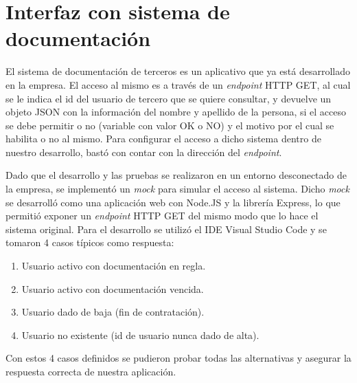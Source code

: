 \section{Interfaz con sistema de documentación}

El sistema de documentación de terceros es un aplicativo que ya está desarrollado en la empresa. El acceso al mismo es a través de un \textit{endpoint} HTTP GET, al cual se le indica el id del usuario de tercero que se quiere consultar, y devuelve un objeto JSON con la información del nombre y apellido de la persona, si el acceso se debe permitir o no (variable con valor OK o NO) y el motivo por el cual se habilita o no al mismo. Para configurar el acceso a dicho sistema dentro de nuestro desarrollo, bastó con contar con la dirección del \textit{endpoint}. 

Dado que el desarrollo y las pruebas se realizaron en un entorno desconectado de la empresa, se implementó un \textit{mock} para simular el acceso al sistema. Dicho \textit{mock} se desarrolló como una aplicación web con Node.JS y la librería Express, lo que permitió exponer un \textit{endpoint} HTTP GET del mismo modo que lo hace el sistema original. Para el desarrollo se utilizó el IDE Visual Studio Code y se tomaron 4 casos típicos como respuesta:

\begin{enumerate}
\item Usuario activo con documentación en regla.
\item Usuario activo con documentación vencida.
\item Usuario dado de baja (fin de contratación).
\item Usuario no existente (id de usuario nunca dado de alta).
\end{enumerate}

Con estos 4 casos definidos se pudieron probar todas las alternativas y asegurar la respuesta correcta de nuestra aplicación.

